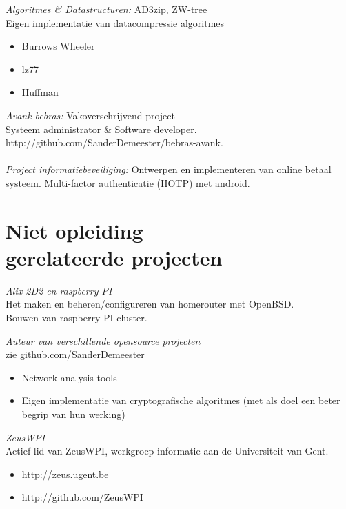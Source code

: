 \documentclass[margin, 10pt]{res} %
\begin{document}
\begin{resume}
{\sl Algoritmes \& Datastructuren:} AD3zip, ZW-tree \\
Eigen implementatie van datacompressie algoritmes
\begin{itemize}
\item Burrows Wheeler
\item lz77
\item Huffman
\end{itemize}
{\sl Avank-bebras:} Vakoverschrijvend project \\
Systeem administrator \& Software developer. \\
http://github.com/SanderDemeester/bebras-avank.
\\ \\
{\sl Project informatiebeveiliging:} Ontwerpen en implementeren van online betaal systeem. Multi-factor authenticatie (HOTP) met android.
 
 
\section{Niet opleiding\\ gerelateerde projecten}

{\sl Alix 2D2 en raspberry PI} \\
Het maken en beheren/configureren van homerouter met OpenBSD. \\
Bouwen van raspberry PI cluster.

{\sl Auteur van verschillende opensource projecten} \\
zie github.com/SanderDemeester
\begin{itemize} \itemsep -2pt
\item Network analysis tools
\item Eigen implementatie van cryptografische algoritmes (met als doel een beter begrip van hun werking)
\end{itemize}

{\sl ZeusWPI} \\
Actief lid van ZeusWPI, werkgroep informatie aan de Universiteit van Gent.
\begin{itemize} \itemsep -2pt
\item{http://zeus.ugent.be}
\item{http://github.com/ZeusWPI}
\end{itemize}


\end{resume}
\end{document}
